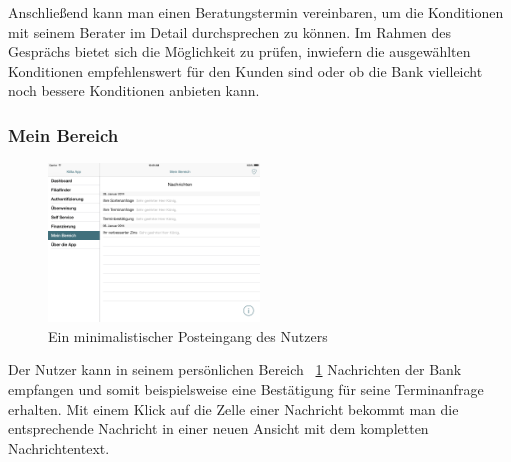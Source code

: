 	Anschließend kann man einen Beratungstermin vereinbaren, um die Konditionen mit seinem Berater im Detail durchsprechen zu können. Im Rahmen des Gesprächs bietet sich die Möglichkeit zu prüfen, inwiefern die ausgewählten Konditionen empfehlenswert für den Kunden sind oder ob die Bank vielleicht noch bessere Konditionen anbieten kann.
\pagebreak
\subsubsection{Mein Bereich}

\begin{figure}[h!]
	\centering
  \includegraphics[width=0.5\textwidth]{Pictures/mbereichneu}
	\caption{Ein minimalistischer Posteingang des Nutzers\label{fig10}}
\end{figure}

	Der Nutzer kann in seinem persönlichen Bereich ~\ref{fig10} Nachrichten der Bank empfangen und somit beispielsweise eine Bestätigung für seine Terminanfrage erhalten. Mit einem Klick auf die Zelle einer Nachricht bekommt man die entsprechende Nachricht in einer neuen Ansicht mit dem kompletten Nachrichtentext.
